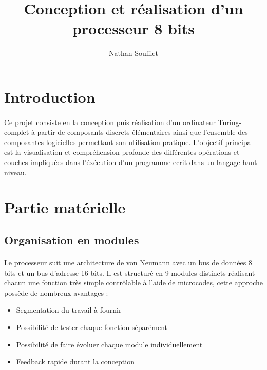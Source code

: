 \documentclass{article}
\begin{document}
    
    \title{Conception et réalisation d'un processeur 8 bits}
    \author{Nathan Soufflet}

    \maketitle
    \newpage

    \section{Introduction}

    \paragraph{}
    Ce projet consiste en la conception puis réalisation d'un ordinateur Turing-complet à partir de
    composants discrets élémentaires ainsi que l'ensemble des composantes logicielles permettant son
    utilisation pratique. L'objectif principal est la visualisation et compréhension profonde des
    différentes opérations et couches impliquées dans l'éxécution d'un programme ecrit dans un langage
    haut niveau.

    \section{Partie matérielle}

    \subsection{Organisation en modules}

    \paragraph{}
    Le processeur suit une architecture de von Neumann avec un bus de données 8 bits et un bus d'adresse 16 bits.
    Il est structuré en 9 modules distincts réalisant chacun une fonction très simple 
    contrôlable à l'aide de microcodes, cette approche possède de nombreux avantages : \\
    \begin{itemize}
    \item Segmentation du travail à fournir
    \item Possibilité de tester chaque fonction séparément
    \item Possibilité de faire évoluer chaque module individuellement
    \item Feedback rapide durant la conception
    \end{itemize}
    
\end{document}
